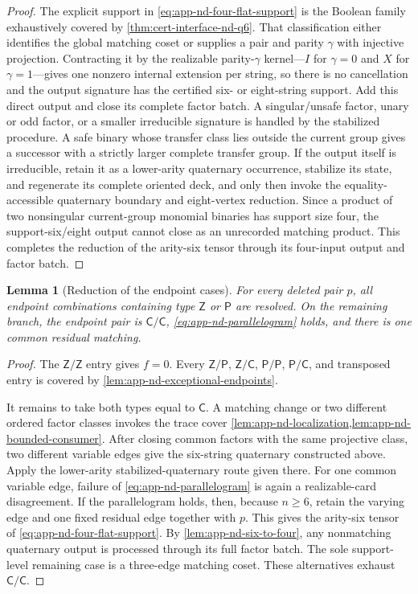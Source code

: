 \documentclass[11pt,letterpaper,onecolumn]{article}
\theoremstyle{plain}
\newtheorem{lemma}[lemma]{Lemma}
\theoremstyle{definition}
\theoremstyle{remark}
\begin{document}
\begin{proof}
The explicit support in \cref{eq:app-nd-four-flat-support} is the Boolean
family exhaustively covered by
\cref{thm:cert-interface-nd-q6}.  That classification either identifies
the global matching coset or supplies a pair and parity \(\gamma\) with
injective projection.  Contracting it by the realizable parity-\(\gamma\)
kernel---\(I\) for \(\gamma=0\) and \(X\) for \(\gamma=1\)---gives one
nonzero internal extension per string,
so there is no cancellation and the output signature has the certified
six- or eight-string support.  Add this direct output and close its complete
factor batch.  A singular/unsafe factor, unary or odd factor, or a smaller
irreducible signature is handled by the stabilized procedure. A safe binary whose transfer class lies outside the
current group gives a successor with a strictly larger complete transfer group.  If the output itself
is irreducible, retain it as a lower-arity quaternary occurrence, stabilize its state, and
regenerate its complete oriented deck, and only then invoke the
equality-accessible quaternary boundary and eight-vertex reduction.  Since a product of two
nonsingular current-group monomial binaries has support size four, the
support-six/eight output cannot close as an unrecorded matching product.
This completes the reduction of the arity-six tensor through its
four-input output and factor batch.
\end{proof}

\begin{lemma}[Reduction of the endpoint cases]
\label{lem:app-nd-endpoint-type}
For every deleted pair \(p\), all endpoint combinations containing type
\(\mathsf Z\) or \(\mathsf P\) are resolved.  On the remaining branch, the
endpoint pair is \(\mathsf{C}/\mathsf{C}\), \cref{eq:app-nd-parallelogram} holds, and there is one
common residual matching.
\end{lemma}

\begin{proof}
The \(\mathsf{Z}/\mathsf{Z}\) entry gives \(f=0\).  Every \(\mathsf{Z}/\mathsf{P}\), \(\mathsf{Z}/\mathsf{C}\), \(\mathsf{P}/\mathsf{P}\),
\(\mathsf{P}/\mathsf{C}\), and transposed entry is covered by
\cref{lem:app-nd-exceptional-endpoints}.

It remains to take both types equal to \(\mathsf C\).  A matching change or two
different ordered factor classes invokes the trace cover
\cref{lem:app-nd-localization,lem:app-nd-bounded-consumer}.  After closing
common factors with the same projective class, two different variable edges give the six-string quaternary constructed above. Apply the lower-arity stabilized-quaternary route
given there.  For one common variable edge, failure of
\cref{eq:app-nd-parallelogram} is again a realizable-card disagreement.  If the
parallelogram holds, then, because \(n\ge6\), retain the varying edge and one
fixed residual edge together with \(p\). This gives the arity-six tensor
of \cref{eq:app-nd-four-flat-support}. By \cref{lem:app-nd-six-to-four},
any nonmatching quaternary output is processed through its full factor batch.
The sole support-level remaining case is a three-edge matching coset.
These alternatives exhaust \(\mathsf{C}/\mathsf{C}\).
\end{proof}
\end{document}
